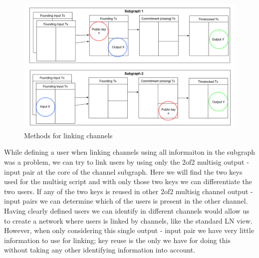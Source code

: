 \begin{figure}[h]
    \centering
    \includegraphics[width=14cm]{figures/linking_subgraphs.png}
    \caption{Methods for linking channels}
    \label{fig:linking_subgraphs}
\end{figure}


While defining a user when linking channels using all informaiton in the subgraph was a problem, we can try to link users by using only the  2of2 multisig output - input pair at the core of the channel subgraph. Here we will find the two keys used for the multisig script and with only those two keys we can differentiate the two users. If any of the two keys is reused in other 2of2 multisig channel output - input pairs we can determine which of the users is present in the other channel. Having clearly defined users we can identify in different channels would allow us to create a network where users is linked by channels, like the standard LN view. However, when only considering this single output - input pair we have very little information to use for linking; key reuse is the only we have for doing this without taking any other identifying information into account.